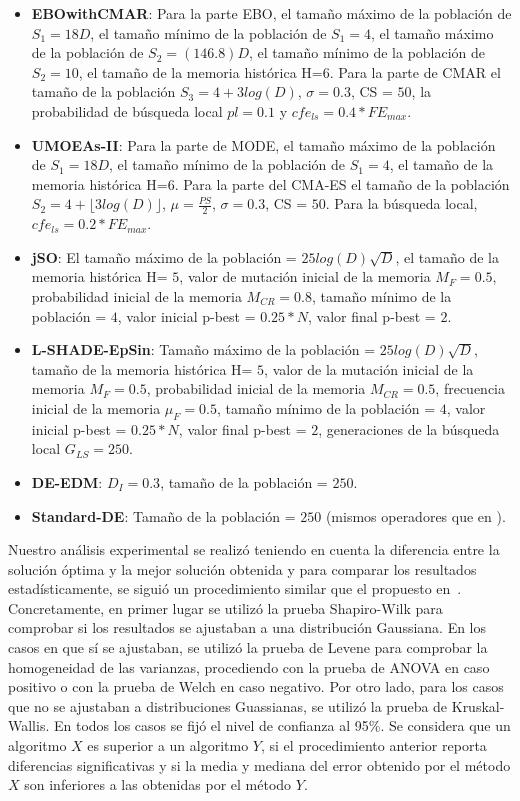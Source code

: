 \begin{itemize}
\item \textbf{EBOwithCMAR}: Para la parte EBO, el tamaño máximo de la población de $S_1 = 18D$, 
el tamaño mínimo de la población de $S_1 = 4$, el tamaño máximo de la población de $S_2 = (146.8)D$, 
el tamaño mínimo de la población de $S_2 = 10$, el tamaño de la memoria histórica H=$6$. 
Para la parte de CMAR el tamaño de la población $S_3 = 4 + 3log(D)$, $\sigma=0.3$, CS = $50$, 
la probabilidad de búsqueda local $pl = 0.1$ y $cfe_{ls} = 0.4* FE_{max}$.
\item \textbf{UMOEAs-II}: Para la parte de MODE, el tamaño máximo de la población de $S_1 = 18D$, el tamaño mínimo de la población de $S_1 = 4$, 
el tamaño de la memoria histórica H=$6$. Para la parte del CMA-ES el tamaño de la población $S_2 = 4 + \lfloor 3log(D) \rfloor$, $\mu=\frac{PS}{2}$, 
$\sigma=0.3$, CS = $50$. Para la búsqueda local, $cfe_{ls} = 0.2 * FE_{max}$.
\item \textbf{jSO}: El tamaño máximo de la población = $25log(D)\sqrt{D}$, el tamaño de la memoria histórica H= $5$, 
valor de mutación inicial de la memoria $M_F = 0.5$, probabilidad inicial de la memoria $M_{CR} = 0.8$, 
tamaño mínimo de la población = $4$, valor inicial p-best = $0.25*N$, valor final p-best = $2$.
\item \textbf{L-SHADE-EpSin}: Tamaño máximo de la población = $25log(D)\sqrt{D}$, tamaño de la memoria histórica H= $5$, 
valor de la mutación inicial de la memoria $M_F = 0.5$, probabilidad inicial de la memoria $M_{CR} = 0.5$, frecuencia inicial de la memoria $\mu_F = 0.5$, 
tamaño mínimo de la población = $4$, valor inicial p-best = $0.25*N$, valor final p-best = $2$, generaciones de la búsqueda local $G_{LS}=250$.
\item \textbf{DE-EDM}: $D_I = 0.3$, tamaño de la población = $250$.
\item \textbf{Standard-DE}: Tamaño de la población = $250$ (mismos operadores que en \DEEDM{}).
\end{itemize}
%

Nuestro análisis experimental se realizó teniendo en cuenta la diferencia entre la solución óptima y la mejor solución obtenida
y para comparar los resultados estadísticamente, se siguió un procedimiento similar que el propuesto en~\cite{Joel:StatisticalTest}.
%
Concretamente, en primer lugar se utilizó la prueba Shapiro-Wilk para comprobar si los resultados se ajustaban a una distribución Gaussiana. 
%
En los casos en que sí se ajustaban, se utilizó la prueba de Levene para comprobar la homogeneidad de las varianzas, procediendo con la prueba de 
ANOVA en caso positivo o con la prueba de Welch en caso negativo.
%
Por otro lado, para los casos que no se ajustaban a distribuciones Guassianas, se utilizó la prueba de Kruskal-Wallis.
%
En todos los casos se fijó el nivel de confianza al 95\%.
%
Se considera que un algoritmo $X$ es superior a un algoritmo $Y$, si el procedimiento anterior reporta diferencias significativas y si la media y mediana 
del error obtenido por el método $X$ son inferiores a las obtenidas por el método $Y$.

